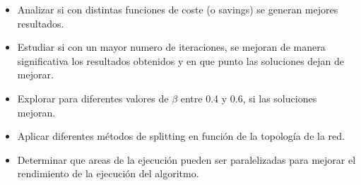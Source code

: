 \documentclass[11pt]{article} %
\begin{document}
\begin{enumerate}
\begin{itemize}
\item Analizar si con distintas funciones de coste (o savings) se generan mejores resultados.
\item Estudiar si con un mayor numero de iteraciones, se mejoran de manera significativa los resultados obtenidos y en que punto las soluciones dejan de mejorar.
\item Explorar para diferentes valores de $\beta$ entre 0.4 y 0.6, si las soluciones mejoran.
\item Aplicar diferentes métodos de splitting en función de la topología de la red.
\item Determinar que areas de la ejecución pueden ser paralelizadas para mejorar el rendimiento de la ejecución del algoritmo.
\end{itemize}

 \end{enumerate}
\end{document}
